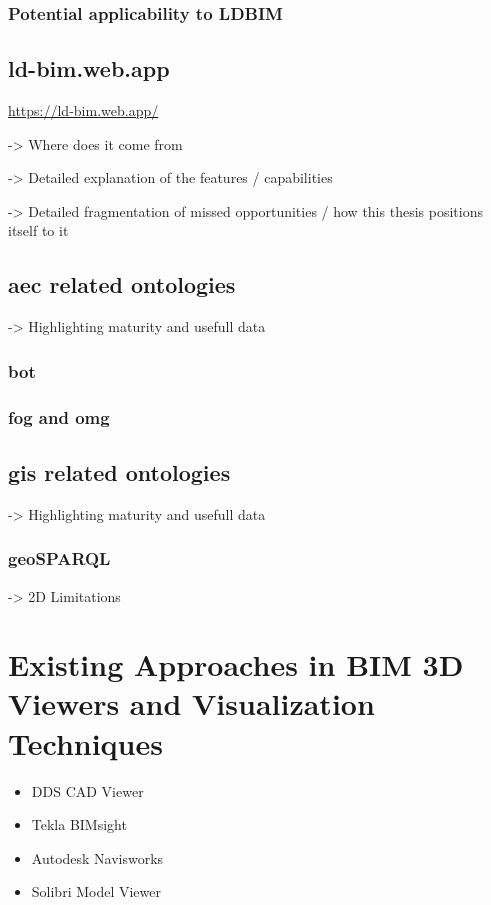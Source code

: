 \subsubsection{Potential applicability to LDBIM}

\subsection{ld-bim.web.app}
\url{https://ld-bim.web.app/}

-> Where does it come from

-> Detailed explanation of the features / capabilities

-> Detailed fragmentation of missed opportunities / how this thesis positions itself to it

\subsection{\acs{aec} related ontologies}
-> Highlighting maturity and usefull data

\subsubsection{\acs{bot}}
\subsubsection{\acs{fog} and \acs{omg}}

\subsection{\acs{gis} related ontologies}
-> Highlighting maturity and usefull data
\subsubsection{geoSPARQL}
-> 2D Limitations


\section{Existing Approaches in BIM 3D Viewers and Visualization Techniques}
\begin{itemize}
    \item DDS CAD Viewer
    \item Tekla BIMsight
    \item Autodesk Navisworks
    \item Solibri Model Viewer
\end{itemize}
